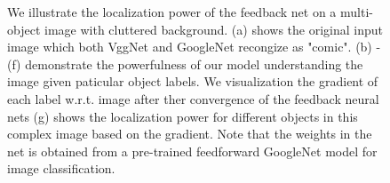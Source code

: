 \begin{figure}
\begin{center}
\caption{We illustrate the localization power of the feedback net on a multi-object image with cluttered background. (a) shows the original input image which both VggNet and GoogleNet recongize as "comic". (b) - (f) demonstrate the powerfulness of our model understanding the image given paticular object labels. We visualization the gradient of each label w.r.t. image after ther convergence of the feedback neural nets (g) shows the localization power for different objects in this complex image based on the gradient. Note that the weights in the net is obtained from a pre-trained feedforward GoogleNet model for image classification.}
\label{fig:splah}
\end{center}
\end{figure}

\setlength{\tabcolsep}{2pt}
